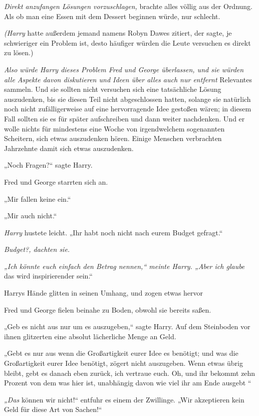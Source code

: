 {\emph{Direkt anzufangen Lösungen vorzuschlagen,} brachte alles völlig aus der Ordnung. Als ob man eine Essen mit dem Dessert beginnen würde, nur schlecht.

\emph{(Harry} hatte außerdem jemand namens Robyn Dawes zitiert, der sagte, je schwieriger ein Problem ist, desto häufiger würden die Leute versuchen es direkt zu lösen.)

\emph{Also würde Harry dieses Problem Fred und George überlassen, und sie würden alle Aspekte davon diskutieren und Ideen über alles auch nur entfernt} Relevantes sammeln. Und sie sollten nicht versuchen sich eine tatsächliche Lösung auszudenken, bis sie diesen Teil nicht abgeschlossen hatten, solange sie natürlich noch nicht zufälligerweise auf eine hervorragende Idee gestoßen wären; in diesem Fall sollten sie es für später aufschreiben und dann weiter nachdenken. Und er wolle nichts für mindestens eine Woche von irgendwelchem sogenannten Scheitern, sich etwas auszudenken hören. Einige Menschen verbrachten Jahrzehnte damit sich etwas auszudenken.

„Noch Fragen?“ sagte Harry.

Fred und George starrten sich an.

„Mir fallen keine ein.“

„Mir auch nicht.“

\emph{Harry} hustete leicht. „Ihr habt noch nicht nach eurem Budget gefragt.“

\emph{Budget?, dachten sie.}

\emph{„Ich könnte euch einfach den Betrag nennen,“ meinte Harry. „Aber ich glaube} das wird inspirierender sein.“

Harrys Hände glitten in seinen Umhang, und zogen etwas hervor \later

Fred und George fielen beinahe zu Boden, obwohl sie bereits saßen.

„Geb es nicht aus nur um es auszugeben,“ sagte Harry. Auf dem Steinboden vor ihnen glitzerten eine absolut lächerliche Menge an Geld.

„Gebt es nur aus wenn die Großartigkeit eurer Idee es benötigt; und was die Großartigkeit eurer Idee benötigt, zögert nicht auszugeben. Wenn etwas übrig bleibt, gebt es danach eben zurück, ich vertraue euch. Oh, und ihr bekommt zehn Prozent von dem was hier ist, unabhängig davon wie viel ihr am Ende ausgebt \later“

\emph{„Das} können wir nicht!“ entfuhr es einem der Zwillinge. „Wir akzeptieren kein Geld für diese Art von Sachen!“

}

